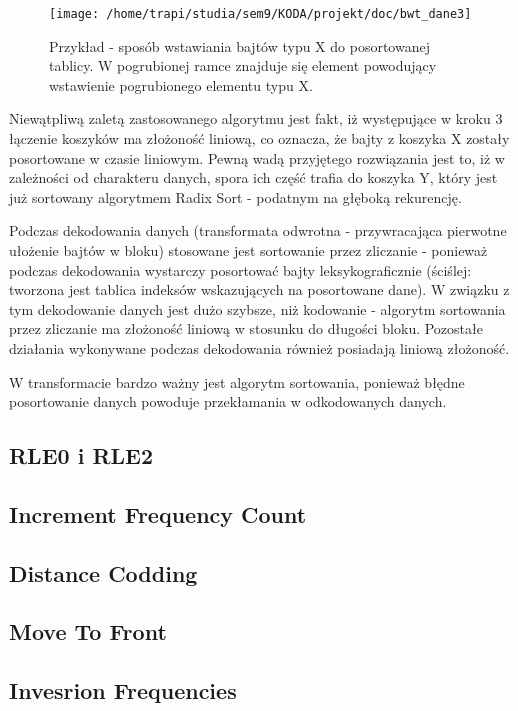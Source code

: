 \documentclass[a4paper,12pt]{article}
\begin{document}
%
\begin{figure}
\texttt{[image: /home/trapi/studia/sem9/KODA/projekt/doc/bwt\_dane3]}

\caption{\label{fig:Spos=0000F3b-wstawiania-bajt=0000F3w}Przykład - sposób
wstawiania bajtów typu X do posortowanej tablicy. W pogrubionej ramce
znajduje się element powodujący wstawienie pogrubionego elementu typu
X.}

\end{figure}
Niewątpliwą zaletą zastosowanego algorytmu jest fakt, iż występujące
w kroku 3 łączenie koszyków ma złożoność liniową, co oznacza, że bajty
z koszyka X zostały posortowane w czasie liniowym. Pewną wadą przyjętego
rozwiązania jest to, iż w zależności od charakteru danych, spora ich
część trafia do koszyka Y, który jest już sortowany algorytmem Radix
Sort - podatnym na głęboką rekurencję.

Podczas dekodowania danych (transformata odwrotna - przywracająca
pierwotne ułożenie bajtów w bloku) stosowane jest sortowanie przez
zliczanie - ponieważ podczas dekodowania wystarczy posortować bajty
leksykograficznie (ściślej: tworzona jest tablica indeksów wskazujących
na posortowane dane). W związku z tym dekodowanie danych jest dużo
szybsze, niż kodowanie - algorytm sortowania przez zliczanie ma złożoność
liniową w stosunku do długości bloku. Pozostałe działania wykonywane
podczas dekodowania również posiadają liniową złożoność.

W transformacie bardzo ważny jest algorytm sortowania, ponieważ błędne
posortowanie danych powoduje przekłamania w odkodowanych danych.

\subsection{RLE0 i RLE2}

\subsection{Increment Frequency Count}

\subsection{Distance Codding}

\subsection{Move To Front}

\subsection{Invesrion Frequencies}
\end{document}
